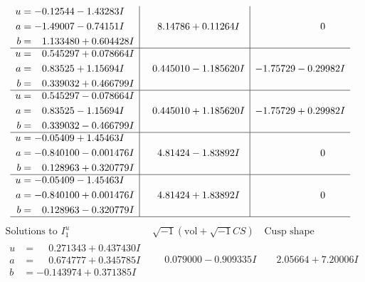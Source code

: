 \documentclass[1p]{elsarticle_modified}
\theoremstyle{definition}
\newcommand{\I}{\sqrt{-1}}
\begin{document}
$$\begin{array}{c|c|c}
\begin{aligned}
u &= -0.12544 - 1.43283 I \\
a &= -1.49007 - 0.74151 I \\
b &= \phantom{-}1.133480 + 0.604428 I\end{aligned}
 & \phantom{-}8.14786 + 0.11264 I & \phantom{-0.000000 } 0 \\ \hline\begin{aligned}
u &= \phantom{-}0.545297 + 0.078664 I \\
a &= \phantom{-}0.83525 + 1.15694 I \\
b &= \phantom{-}0.339032 + 0.466799 I\end{aligned}
 & \phantom{-}0.445010 - 1.185620 I & -1.75729 - 0.29982 I \\ \hline\begin{aligned}
u &= \phantom{-}0.545297 - 0.078664 I \\
a &= \phantom{-}0.83525 - 1.15694 I \\
b &= \phantom{-}0.339032 - 0.466799 I\end{aligned}
 & \phantom{-}0.445010 + 1.185620 I & -1.75729 + 0.29982 I \\ \hline\begin{aligned}
u &= -0.05409 + 1.45463 I \\
a &= -0.840100 - 0.001476 I \\
b &= \phantom{-}0.128963 + 0.320779 I\end{aligned}
 & \phantom{-}4.81424 - 1.83892 I & \phantom{-0.000000 } 0 \\ \hline\begin{aligned}
u &= -0.05409 - 1.45463 I \\
a &= -0.840100 + 0.001476 I \\
b &= \phantom{-}0.128963 - 0.320779 I\end{aligned}
 & \phantom{-}4.81424 + 1.83892 I & \phantom{-0.000000 } 0\\
 \hline 
 \end{array}$$\newpage$$\begin{array}{c|c|c}  
\text{Solutions to }I^u_{1}& \I (\text{vol} + \sqrt{-1}CS) & \text{Cusp shape}\\
 \hline 
\begin{aligned}
u &= \phantom{-}0.271343 + 0.437430 I \\
a &= \phantom{-}0.674777 + 0.345785 I \\
b &= -0.143974 + 0.371385 I\end{aligned}
 & \phantom{-}0.079000 - 0.909335 I & \phantom{-}2.05664 + 7.20006 I \\ \hline\begin{aligned}

\end{aligned}
\end{array}$$
\end{document}
